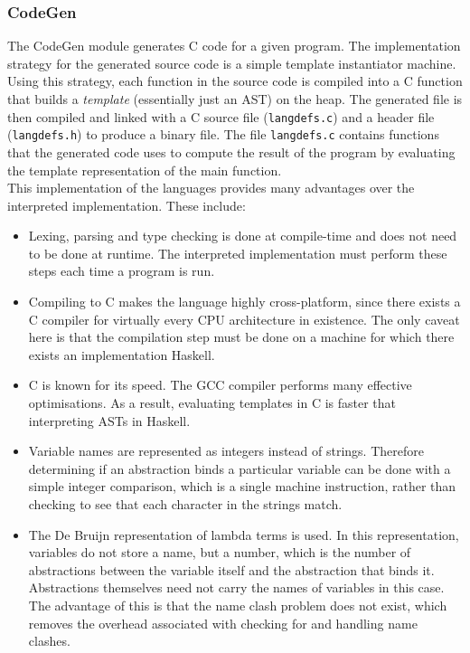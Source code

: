 \documentclass{article}
\begin{document}
\subsubsection{CodeGen}
The CodeGen module generates C code for a given program. The implementation strategy for the generated source code is a simple template instantiator machine. Using this strategy, each function in the source code is compiled into a C function that builds a \emph{template} (essentially just an AST) on the heap. The generated file is then compiled and linked with a C source file (\texttt{langdefs.c}) and a header file (\texttt{langdefs.h}) to produce a binary file. The file \texttt{langdefs.c} contains functions that the generated code uses to compute the result of the program by evaluating the template representation of the main function.
\\\indent This implementation of the languages provides many advantages over the interpreted implementation. These include:
\begin{itemize}
    \item Lexing, parsing and type checking is done at compile-time and does not need to be done at runtime. The interpreted implementation must perform these steps each time a program is run.
    \item Compiling to C makes the language highly cross-platform, since there exists a C compiler for virtually every CPU architecture in existence. The only caveat here is that the compilation step must be done on a machine for which there exists an implementation Haskell.
    \item C is known for its speed. The GCC compiler performs many effective optimisations. As a result, evaluating templates in C is faster that interpreting ASTs in Haskell.
    \item Variable names are represented as integers instead of strings. Therefore determining if an abstraction binds a particular variable can be done with a simple integer comparison, which is a single machine instruction, rather than checking to see that each character in the strings match.
    \item The De Bruijn representation of lambda terms is used. In this representation, variables do not store a name, but a number, which is the number of abstractions between the variable itself and the abstraction that binds it. Abstractions themselves need not carry the names of variables in this case. The advantage of this is that the name clash problem does not exist, which removes the overhead associated with checking for and handling name clashes.
\end{itemize}
\end{document}
